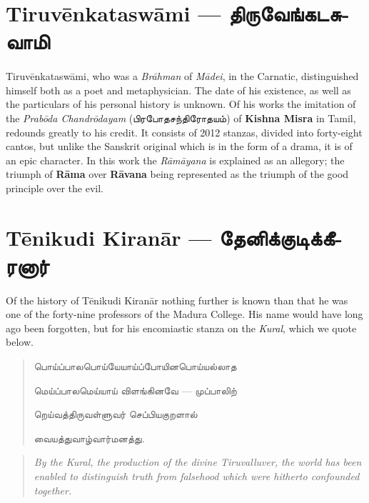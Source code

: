 \documentclass{article}
\newcommand{\TamilText}[1]{\texttamil{#1}}
\newcommand{\TamilBold}[1]{\texttamil{\textbf{#1}}}
\newcommand{\tam}[1]{\TamilText{#1}}
\newcommand{\tambold}[1]{\TamilBold{#1}}
\begin{document}
\section{Tiruv\={e}nkatasw\={a}mi --- \tambold{திருவேங்கடசுவாமி}}
\paragraph{}
Tiruv\={e}nkatasw\={a}mi, who was a \emph{Br\={a}hman} of \emph{M\={a}dei}, in the Carnatic, distinguished himself both as a poet and metaphysician. The date of his existence, as well as the particulars of his personal history is unknown. Of his works the imitation of the \emph{Prab\={o}da Chandr\={o}dayam} (\tam{பிரபோதசந்திரோதயம்}) of \textbf{Kishna Misra} in Tamil, redounds greatly to his credit. It consists of 2012 stanzas, divided into forty-eight cantos, but unlike the Sanskrit original which is in the form of a drama, it is of an epic character. In this work the \emph{R\={a}m\={a}yana} is explained as an allegory; the triumph of \textbf{R\={a}ma} over \textbf{R\={a}vana} being represented as the triumph of the good principle over the evil.

\section{T\={e}nikudi Kiran\={a}r --- \tambold{தேனிக்குடிக்கீரனார்}}
\paragraph{}
Of the history of T\={e}nikudi Kiran\={a}r nothing further is known than that he was one of the forty-nine professors of the Madura College. His name would have long ago been forgotten, but for his encomiastic stanza on the \emph{Kural}, which we quote below.
\begin{quotation}\small
\tam{பொய்ப்பாலபொய்யேயாய்ப்போயினபொய்யல்லாத}

\tam{மெய்ப்பாலமெய்யாய்‌ விளங்கினவே} --- \tam{முப்பாலிற்‌}

\tam{றெய்வத்திருவள்ளுவர்‌ செப்பியகுறளால்‌}

\tam{வையத்துவாழ்வார்மனத்து}.
\end{quotation}
\begin{quotation}\small
\emph{By the Kural, the production of the divine Tiruvalluver, the world has been enabled to distinguish truth from falsehood which were hitherto confounded together.}
\end{quotation}
\end{document}
